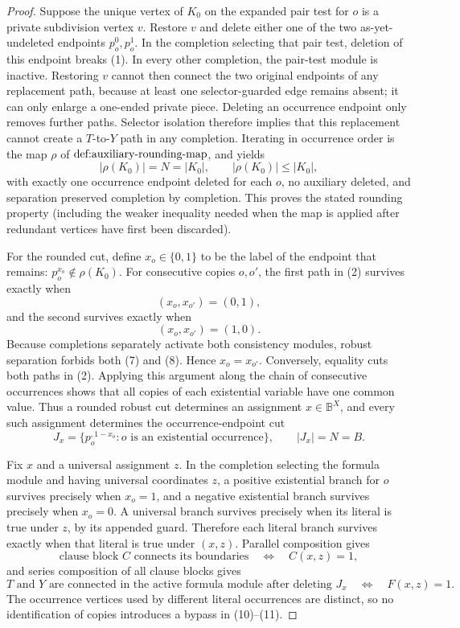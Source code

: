 \documentclass{article}
\begin{document}
\begin{proof}
Suppose the unique vertex of \(K_0\) on the expanded pair test for \(o\) is a private subdivision vertex \(v\).  Restore \(v\) and delete either one of the two as-yet-undeleted endpoints \(p_o^0,p_o^1\).  In the completion selecting that pair test, deletion of this endpoint breaks (1).  In every other completion, the pair-test module is inactive.  Restoring \(v\) cannot then connect the two original endpoints of any replacement path, because at least one selector-guarded edge remains absent; it can only enlarge a one-ended private piece.  Deleting an occurrence endpoint only removes further paths.  Selector isolation therefore implies that this replacement cannot create a \(T\)-to-\(Y\) path in any completion.  Iterating in occurrence order is the map \(\rho\) of \(\textnormal{def:auxiliary-rounding-map}\), and yields
\[
|\rho(K_0)|=N=|K_0|, \qquad
|\rho(K_0)|\le |K_0|, \tag{6}
\]
with exactly one occurrence endpoint deleted for each \(o\), no auxiliary deleted, and separation preserved completion by completion.  This proves the stated rounding property (including the weaker inequality needed when the map is applied after redundant vertices have first been discarded).

For the rounded cut, define \(x_o\in\{0,1\}\) to be the label of the endpoint that remains: \(p_o^{x_o}\notin\rho(K_0)\).  For consecutive copies \(o,o'\), the first path in (2) survives exactly when
\[
(x_o,x_{o'})=(0,1), \tag{7}
\]
and the second survives exactly when
\[
(x_o,x_{o'})=(1,0). \tag{8}
\]
Because completions separately activate both consistency modules, robust separation forbids both (7) and (8).  Hence \(x_o=x_{o'}\).  Conversely, equality cuts both paths in (2).  Applying this argument along the chain of consecutive occurrences shows that all copies of each existential variable have one common value.  Thus a rounded robust cut determines an assignment \(x\in\mathbb B^X\), and every such assignment determines the occurrence-endpoint cut
\[
J_x=\{p_o^{,1-x_o}:o\text{ is an existential occurrence}\},
\qquad |J_x|=N=B. \tag{9}
\]

Fix \(x\) and a universal assignment \(z\).  In the completion selecting the formula module and having universal coordinates \(z\), a positive existential branch for \(o\) survives precisely when \(x_o=1\), and a negative existential branch survives precisely when \(x_o=0\).  A universal branch survives precisely when its literal is true under \(z\), by its appended guard.  Therefore each literal branch survives exactly when that literal is true under \((x,z)\).  Parallel composition gives
\[
\text{clause block }C\text{ connects its boundaries}
\quad\Longleftrightarrow\quad C(x,z)=1, \tag{10}
\]
and series composition of all clause blocks gives
\[
T\text{ and }Y\text{ are connected in the active formula module after deleting }J_x
\quad\Longleftrightarrow\quad F(x,z)=1. \tag{11}
\]
The occurrence vertices used by different literal occurrences are distinct, so no identification of copies introduces a bypass in (10)--(11).


\end{proof}
\end{document}
